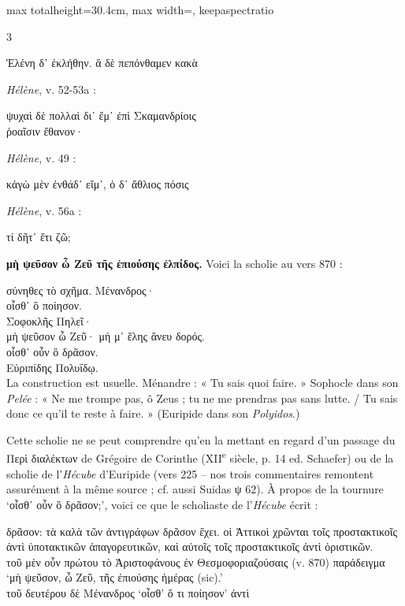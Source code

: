 \documentclass[11pt,twoside]{book}
\newcommand{\italique}[1]{\textit{#1}}
\newcommand{\citComm}[1]{\begin{quoting}[vskip=0.4pt,leftmargin=0.7em,rightmargin=0.2em]#1\end{quoting}}
\newcommand{\nieme}[1]{#1\textsuperscript{e}}
\newcommand{\alinea}{\hspace{1.2em}}
\newcommand{\francais}[1]{{\policeFr #1}}
\newcommand{\difference}[1]{\dotuline{#1}}
\begin{document}
\begin{adjustbox}{max totalheight=30.4cm, max width=\textwidth, keepaspectratio}
\begin{minipage}{\textwidth}
{\begin{multicols}{3}
\citComm{Ἑλένη δ᾽ ἐκλήθην. ἃ δὲ πεπόνθαμεν κακὰ}
\par\vspace{1.5pt}
 \textbf{} \italique{Hélène}, v. 52-53a :
\citComm{ψυχαὶ δὲ πολλαὶ δι᾽ ἔμ᾽ ἐπὶ Σκαμανδρίοις\\
ῥοαῖσιν ἔθανον· \difference{ἡ δὲ πάντα τλᾶσ᾽ ἐγὼ}}
\par\vspace{1.5pt}
 \textbf{} \italique{Hélène}, v. 49 :
\citComm{κἀγὼ μὲν ἐνθάδ᾽ εἴμ᾽, ὁ δ᾽ ἄθλιος πόσις}
\par\vspace{1.5pt}
\noindent \italique{Hélène}, v. 56a :
\citComm{τί δῆτ᾽ ἔτι ζῶ; }
\par\vspace{1.5pt}
 \textbf{μὴ ψεῦσον ὦ Ζεῦ τῆς ἐπιούσης ἐλπίδος.} Voici la scholie au vers 870 :
\citComm{σύνηθες τὸ σχῆμα. Μένανδρος·\\
\alinea οἶσθ᾽ ὃ ποίησον.\\
Σοφοκλῆς Πηλεῖ·\\
\alinea μὴ ψεῦσον ὦ Ζεῦ· μή μ᾽ ἕλης ἄνευ δορός.\\
\alinea οἶσθ᾽ οὖν ὃ δρᾶσον.\\
Εὐριπίδης Πολυΐδῳ.\\
\francais{La construction est usuelle. Ménandre : 
« Tu sais quoi faire. » 
Sophocle dans son \italique{Pelée} : 
« Ne me trompe pas, ô Zeus ; tu ne me prendras pas sans lutte. /
Tu sais donc ce qu'il te reste à faire. »
(Euripide dans son \italique{Polyidos}.)}}
\par\vspace{1.5pt}
\noindent Cette scholie ne se peut comprendre qu'en la mettant en regard d'un passage du Περὶ διαλέκτων de Grégoire de Corinthe (\nieme{XII} siècle, p. 14 ed. Schaefer) ou de la scholie de l'\italique{Hécube} d'Euripide (vers 225 -- nos trois commentaires remontent assurément à la même source ; cf. aussi Suidas ψ 62). À propos de la tournure `οἶσθ᾽ οὖν ὃ δρᾶσον;', voici ce que le scholiaste de l'\italique{Hécube} écrit :
\citComm{δρᾶσον: τὰ καλὰ τῶν ἀντιγράφων δρᾶσον ἔχει. οἱ Ἀττικοὶ χρῶνται τοῖς προστακτικοῖς ἀντὶ ὑποτακτικῶν ἀπαγορευτικῶν, καὶ αὐτοῖς τοῖς προστακτικοῖς ἀντὶ ὁριστικῶν.\\
τοῦ μὲν οὖν πρώτου τὸ Ἀριστοφάνους ἐν Θεσμοφοριαζούσαις (v. 870) παράδειγμα `μὴ ψεῦσον, ὦ Ζεῦ, τῆς ἐπιούσης ἡμέρας (sic).'\\
τοῦ δευτέρου δὲ Μένανδρος `οἶσθ' ὅ τι ποίησον' ἀντὶ 





}
\end{multicols}}
\end{minipage}
\end{adjustbox}
\end{document}
